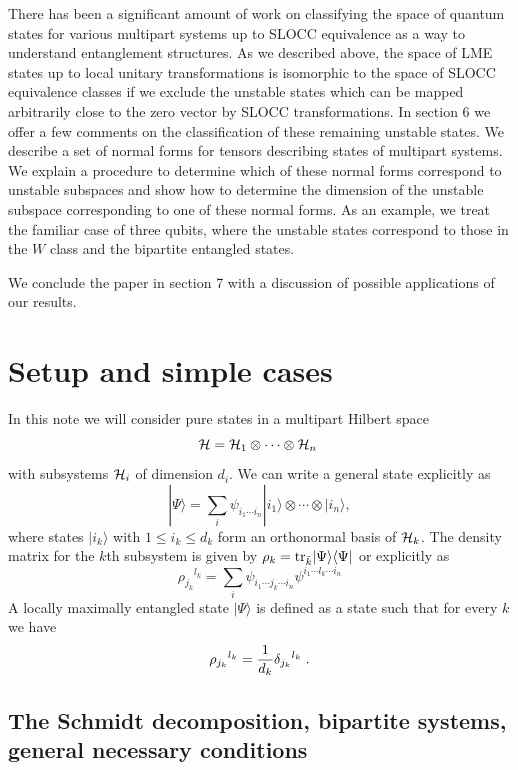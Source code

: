 \documentclass[12pt]{article}
\theoremstyle{definition}
\newcommand{\be}{\begin{equation}}
\newcommand{\ee}{\end{equation}}
\newcommand{\tr}{{\rm tr}}
\begin{document}
There has been a significant amount of work on classifying the space of quantum states for various multipart systems up to SLOCC equivalence as a way to understand entanglement structures. As we described above, the space of LME states up to local unitary transformations is isomorphic to the space of SLOCC equivalence classes if we exclude the unstable states which can be mapped arbitrarily close to the zero vector by SLOCC transformations. In section 6 we offer a few comments on the classification of these remaining unstable states. We describe a set of normal forms for tensors describing states of multipart systems. We explain a procedure to determine which of these normal forms correspond to unstable subspaces and show how to determine the dimension of the unstable subspace corresponding to one of these normal forms. As an example, we treat the familiar case of three qubits, where the unstable states correspond to those in the $W$ class and the bipartite entangled states.

We conclude the paper in section 7 with a discussion of possible applications of our results.

\section{Setup and simple cases}

In this note we will consider pure states in a multipart Hilbert space
\[
{\cal H} = {\cal H}_{1} \otimes \cdots \otimes {\cal H}_{n} \;
\]
with subsystems ${\cal H}_i$ of dimension $d_i$. We can write a general state explicitly as
\be
|\Psi \rangle = \sum_i \psi_{i_1 \cdots i_n} |i_1 \rangle \otimes \cdots \otimes |i_n \rangle,
\ee
where states $|i_k \rangle$ with $1 \le i_k \le d_k$ form an orthonormal basis of ${\cal H}_k$. The density matrix for the $k$th subsystem is given by $\rho_k = \tr_{\bar{k}} | \Psi \rangle \langle \Psi |$ or explicitly as
\be
\rho_{j_k} {}^{l_k} = \sum_{i}  \psi_{i_1 \cdots j_k \cdots i_n}\psi^{i_1 \cdots l_k \cdots i_n}
\ee
A locally maximally entangled state $|\Psi \rangle$ is defined as a state such that for every $k$ we have
\be
\rho_{j_k} {}^{l_k} = {1 \over d_k} \delta_{j_k} {}^{l_k} \; .
\ee

\subsection{The Schmidt decomposition, bipartite systems, general necessary conditions}
\end{document}
